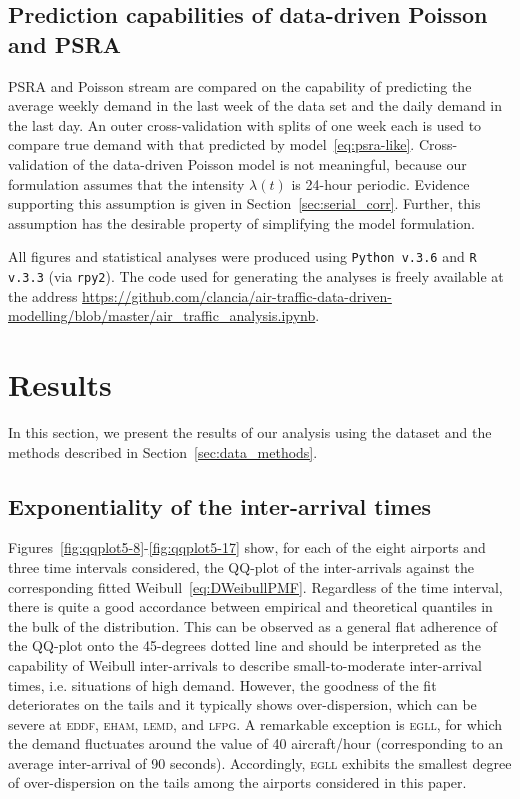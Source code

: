 \documentclass[draft,review]{elsarticle}
\makeatletter
\newcommand*{\ie}{i.e.\@\xspace}
\newcommand{\airp}[1]{\textcolor{#1}{\textsc{#1}}}
\makeatother
\begin{document}
\subsection{Prediction capabilities of data-driven Poisson and \acs{PSRA}}\label{sec:dm_comparison}

\ac{PSRA} and Poisson stream are compared on the capability of predicting the average weekly demand in the last week of the data set and the daily demand in the last day.
An outer cross-validation with splits of one week each is used to compare true demand with that predicted by model~\eqref{eq:psra-like}.
Cross-validation of the data-driven Poisson model is not meaningful, because our formulation assumes that the intensity \(\lambda(t)\) is 24-hour periodic.
Evidence supporting this assumption is given in Section~\ref{sec:serial_corr}.
Further, this assumption has the desirable property of simplifying the model formulation.

All figures and statistical analyses were produced using \texttt{Python v.3.6} and \texttt{R v.3.3} (via \texttt{rpy2}). The code used for generating the analyses is freely available at the address \url{https://github.com/clancia/air-traffic-data-driven-modelling/blob/master/air_traffic_analysis.ipynb}.

\section{Results}\label{sec:results}

In this section, we present the results of our analysis using the dataset and the methods described in Section~\ref{sec:data_methods}.

\subsection{Exponentiality of the inter-arrival times}\label{sec:exp}

Figures~\ref{fig:qqplot5-8}-\ref{fig:qqplot5-17} show, for each of the eight airports and three time intervals considered, the QQ-plot of the inter-arrivals against the corresponding fitted Weibull~\eqref{eq:DWeibullPMF}.
Regardless of the time interval, there is quite a good accordance between empirical and theoretical quantiles in the bulk of the distribution.
This can be observed as a general flat adherence of the QQ-plot onto the 45-degrees dotted line and should be interpreted as the capability of Weibull inter-arrivals to describe small-to-moderate inter-arrival times, \ie{} situations of high demand.
However, the goodness of the fit deteriorates on the tails and it typically shows over-dispersion, which can be severe at \airp{eddf}, \airp{eham}, \airp{lemd}, and \airp{lfpg}.
A remarkable exception is \airp{egll}, for which the demand fluctuates around the value of 40 aircraft/hour (corresponding to an average inter-arrival of 90 seconds).
Accordingly, \airp{egll} exhibits the smallest degree of over-dispersion on the tails among the airports considered in this paper.
\end{document}
